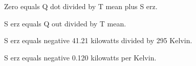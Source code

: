Zero equals Q dot divided by T mean plus S erz.  

S erz equals Q out divided by T mean.  

S erz equals negative 41.21 kilowatts divided by 295 Kelvin.  

S erz equals negative 0.120 kilowatts per Kelvin.